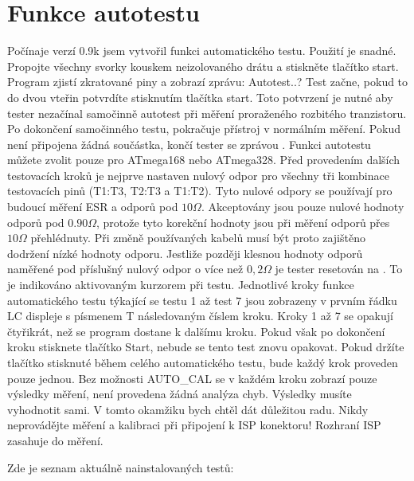 
\section{Funkce autotestu}
\label{sec:selftest}
Počínaje verzí 0.9k jsem vytvořil funkci automatického testu.
Použití je snadné.
Propojte všechny svorky kouskem neizolovaného drátu a stiskněte tlačítko start.
Program zjistí zkratované piny a zobrazí zprávu: Autotest..?
Test začne, pokud to do dvou vteřin potvrdíte stisknutím tlačítka start.
Toto potvrzení je nutné aby tester nezačínal samočinně autotest při měření proraženého rozbitého tranzistoru.
Po dokončení samočinného testu, pokračuje přístroj v normálním měření.
Pokud není připojena žádná součástka, končí tester se zprávou .
Funkci autotestu můžete zvolit pouze pro ATmega168 nebo ATmega328.
Před provedením dalších testovacích kroků je nejprve nastaven nulový odpor pro všechny tři kombinace testovacích pinů
(T1:T3, T2:T3 a T1:T2). Tyto nulové odpory se používají pro budoucí měření ESR a odporů pod \(10\Omega\).
Akceptovány jsou pouze nulové hodnoty odporů pod \(0.90\Omega\), protože tyto korekční hodnoty jsou při měření odporů přes \(10\Omega\) přehlédnuty.
Při změně používaných kabelů musí být proto zajištěno dodržení nízké hodnoty odporu.
Jestliže později klesnou hodnoty odporů naměřené pod příslušný nulový odpor o více
než \(0,2\Omega\) je tester resetován na .
To je indikováno aktivovaným kurzorem při testu.
Jednotlivé kroky funkce automatického testu týkající se testu 1 až test 7 jsou zobrazeny v prvním řádku LC displeje s písmenem T následovaným číslem kroku.
Kroky 1 až 7 se opakují čtyřikrát, než se program dostane k dalšímu kroku.
Pokud však po dokončení kroku stisknete tlačítko Start, nebude se tento test znovu opakovat.
Pokud držíte tlačítko stisknuté během celého automatického testu, bude každý krok proveden pouze jednou.
Bez možnosti AUTO\_CAL se v každém kroku zobrazí pouze výsledky měření, není provedena žádná analýza chyb.
Výsledky musíte vyhodnotit sami.
V tomto okamžiku bych chtěl dát důležitou radu.
Nikdy neprovádějte měření a kalibraci při připojení k ISP konektoru! Rozhraní ISP zasahuje do měření.

\vspace{1cm}
Zde je seznam aktuálně nainstalovaných testů:
\vspace{1cm}

